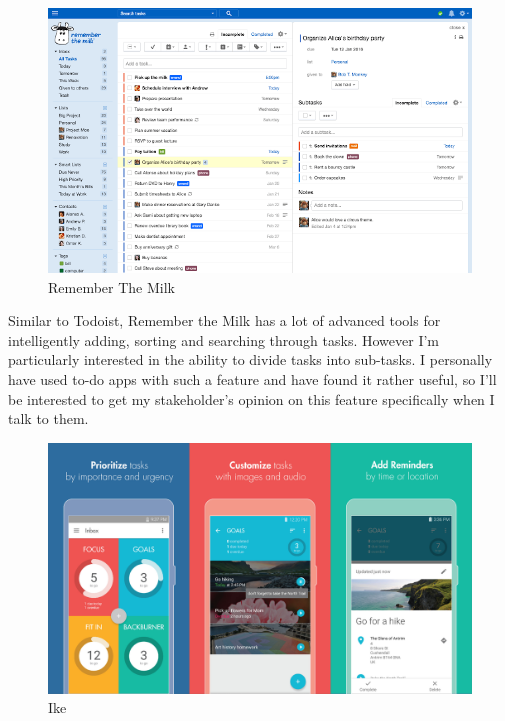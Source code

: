 \documentclass[]{article}
\begin{document}
\begin{figure}
\hypertarget{fig:rtm1}{%
\centering
\includegraphics{./tex2pdf.-ae8b3c0afe160db8/243fbf714a614e0b0aee7186756111a073fa79c3.png}
\caption{Remember The Milk{}}\label{fig:rtm1}
}
\end{figure}

Similar to Todoist, Remember the Milk has a lot of advanced tools for
intelligently adding, sorting and searching through tasks. However I'm
particularly interested in the ability to divide tasks into sub-tasks. I
personally have used to-do apps with such a feature and have found it
rather useful, so I'll be interested to get my stakeholder's opinion on
this feature specifically when I talk to them.

\begin{figure}
\hypertarget{fig:ike1}{%
\centering
\includegraphics{./tex2pdf.-ae8b3c0afe160db8/514a19219ce1dbefdb0b57c1fa99a8f6e1734dc6.png}
\caption{Ike{}}\label{fig:ike1}
}
\end{figure}
\end{document}
